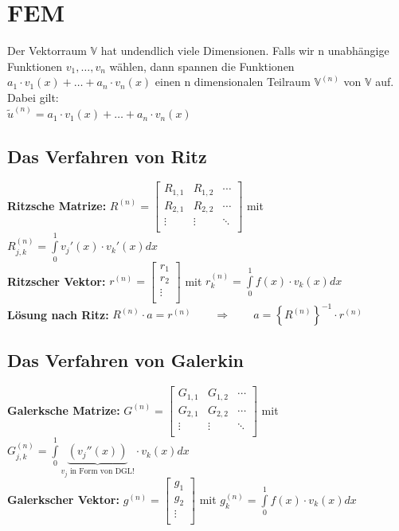 \clearpage
\section{FEM}

Der Vektorraum $\mathbb{V}$ hat undendlich viele Dimensionen. Falls wir n unabhängige Funktionen $v_1,\ldots,v_n$ wählen, dann spannen die Funktionen $a_1\cdot v_1(x)+\ldots+a_n\cdot v_n(x)$ einen n dimensionalen Teilraum $\mathbb{V}^{(n)}$  von $\mathbb{V}$ auf. Dabei gilt:\\

$\boxed{\tilde{u}^{(n)}=a_1\cdot v_1(x)+\ldots+a_n\cdot v_n(x)}$
\subsection{Das Verfahren von Ritz}
\textbf{Ritzsche Matrize: }
$R^{(n)}=\begin{bmatrix}
		R_{1,1} & R_{1,2} & \cdots \\
		R_{2,1} & R_{2,2} & \cdots \\
		\vdots  & \vdots  & \ddots \\
	\end{bmatrix}$ \qquad mit \qquad $R_{j,k}^{(n)}=\int\limits_{0}^{1}{v_j'(x)\cdot
		v_k'(x) dx}$\\
\textbf{Ritzscher Vektor: }
$r^{(n)}=\begin{bmatrix}
		r_1    \\
		r_2    \\
		\vdots \\
	\end{bmatrix}$ \qquad mit \qquad $r_{k}^{(n)}=\int\limits_{0}^{1}{f(x)\cdot v_k(x) dx}$\\

\textbf{Lösung nach Ritz:} $R^{(n)}\cdot a=r^{(n)}\qquad \Rightarrow \qquad a=\left\{R^{(n)}\right\}^{-1}\cdot r^{(n)}$
\subsection{Das Verfahren von Galerkin}
\textbf{Galerksche Matrize: }
$G^{(n)}=\begin{bmatrix}
		G_{1,1} & G_{1,2} & \cdots \\
		G_{2,1} & G_{2,2} & \cdots \\
		\vdots  & \vdots  & \ddots \\
	\end{bmatrix}$ \qquad mit \qquad $G_{j,k}^{(n)}=\int\limits_{0}^{1}{\underbrace{(v_j''(x))}_{v_j \text{ in Form von DGL!}}\cdot v_k(x) dx}$\\
\textbf{Galerkscher Vektor: }
$g^{(n)}=\begin{bmatrix}
		g_1    \\
		g_2    \\
		\vdots \\
	\end{bmatrix}$ \qquad mit \qquad $g_{k}^{(n)}=\int\limits_{0}^{1}{f(x)\cdot v_k(x) dx}$\\

